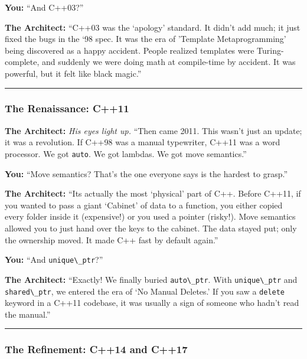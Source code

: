 \textbf{You:} ``And C++03?''

\textbf{The Architect:} ``C++03 was the `apology' standard. It didn't
add much; it just fixed the bugs in the `98 spec. It was the era of
'Template Metaprogramming' being discovered as a happy accident. People
realized templates were Turing-complete, and suddenly we were doing math
at compile-time by accident. It was powerful, but it felt like black
magic.''

\begin{center}\rule{0.5\linewidth}{0.5pt}\end{center}

\hypertarget{the-renaissance-c11}{%
\subsubsection{The Renaissance: C++11}\label{the-renaissance-c11}}

\textbf{The Architect:} \emph{His eyes light up.} ``Then came 2011. This
wasn't just an update; it was a revolution. If C++98 was a manual
typewriter, C++11 was a word processor. We got
\passthrough{\lstinline!auto!}. We got lambdas. We got move semantics.''

\textbf{You:} ``Move semantics? That's the one everyone says is the
hardest to grasp.''

\textbf{The Architect:} ``Its actually the most `physical' part of C++.
Before C++11, if you wanted to pass a giant `Cabinet' of data to a
function, you either copied every folder inside it (expensive!) or you
used a pointer (risky!). Move semantics allowed you to just hand over
the keys to the cabinet. The data stayed put; only the ownership moved.
It made C++ fast by default again.''

\textbf{You:} ``And \passthrough{\lstinline!unique\_ptr!}?''

\textbf{The Architect:} ``Exactly! We finally buried
\passthrough{\lstinline!auto\_ptr!}. With
\passthrough{\lstinline!unique\_ptr!} and
\passthrough{\lstinline!shared\_ptr!}, we entered the era of `No Manual
Deletes.' If you saw a \passthrough{\lstinline!delete!} keyword in a
C++11 codebase, it was usually a sign of someone who hadn't read the
manual.''

\begin{center}\rule{0.5\linewidth}{0.5pt}\end{center}

\hypertarget{the-refinement-c14-and-c17}{%
\subsubsection{The Refinement: C++14 and
C++17}\label{the-refinement-c14-and-c17}}

